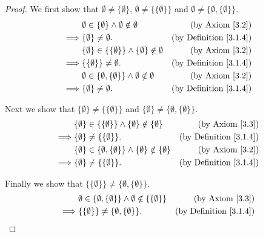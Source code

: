 \begin{proof}
    We first show that \(\emptyset \neq \{\emptyset\}\), \(\emptyset \neq \{\{\emptyset\}\}\) and \(\emptyset \neq \{\emptyset, \{\emptyset\}\}\).
    \begin{align*}
                 & \emptyset \in \{\emptyset\} \land \emptyset \notin \emptyset                & \text{(by Axiom \ref{3.2})}        \\
        \implies & \{\emptyset\} \neq \emptyset.                                               & \text{(by Definition \ref{3.1.4})} \\
                 & \{\emptyset\} \in \{\{\emptyset\}\} \land \{\emptyset\} \notin \emptyset    & \text{(by Axiom \ref{3.2})}        \\
        \implies & \{\{\emptyset\}\} \neq \emptyset.                                           & \text{(by Definition \ref{3.1.4})} \\
                 & \emptyset \in \{\emptyset, \{\emptyset\}\} \land \emptyset \notin \emptyset & \text{(by Axiom \ref{3.2})}        \\
        \implies & \{\emptyset\} \neq \emptyset.                                               & \text{(by Definition \ref{3.1.4})}
    \end{align*}

    Next we show that \(\{\emptyset\} \neq \{\{\emptyset\}\}\) and \(\{\emptyset\} \neq \{\emptyset, \{\emptyset\}\}\).
    \begin{align*}
                 & \{\emptyset\} \in \{\{\emptyset\}\} \land \{\emptyset\} \notin \{\emptyset\}            & \text{(by Axiom \ref{3.3})}        \\
        \implies & \{\emptyset\} \neq \{\{\emptyset\}\}.                                                   & \text{(by Definition \ref{3.1.4})} \\
                 & \{\emptyset\} \in \{\emptyset, \{\emptyset\}\} \land \{\emptyset\} \notin \{\emptyset\} & \text{(by Axiom \ref{3.2})}        \\
        \implies & \{\emptyset\} \neq \{\{\emptyset\}\}.                                                   & \text{(by Definition \ref{3.1.4})}
    \end{align*}

    Finally we show that \(\{\{\emptyset\}\} \neq \{\emptyset, \{\emptyset\}\}\).
    \begin{align*}
                 & \emptyset \in \{\emptyset, \{\emptyset\}\} \land \emptyset \notin \{\{\emptyset\}\} & \text{(by Axiom \ref{3.3})}        \\
        \implies & \{\{\emptyset\}\} \neq \{\emptyset, \{\emptyset\}\}.                                & \text{(by Definition \ref{3.1.4})}
    \end{align*}
\end{proof}

